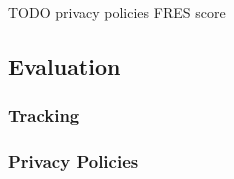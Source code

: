 {\color{red}TODO privacy policies FRES score}

\subsection{Evaluation}

\subsubsection{Tracking}

\subsubsection{Privacy Policies}


